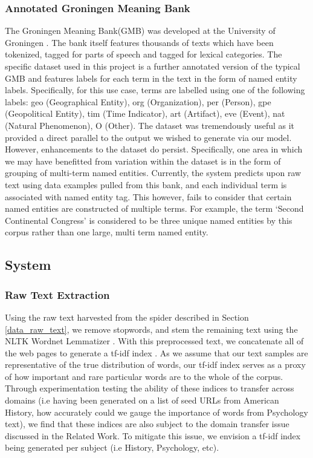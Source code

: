 \documentclass[11pt,a4paper]{article}
\begin{document}
\subsubsection{Annotated Groningen Meaning Bank}
The Groningen Meaning Bank(GMB) was developed at the University of Groningen \cite{Bos2017GMB}. The bank itself features thousands of texts which have been tokenized, tagged for parts of speech and tagged for lexical categories. The specific dataset used in this project is a further annotated version of the typical GMB and features labels for each term in the text in the form of named entity labels. Specifically, for this use case, terms are labelled using one of the following labels: geo (Geographical Entity), org (Organization), per (Person), gpe (Geopolitical Entity), tim (Time Indicator), art (Artifact), eve (Event), nat (Natural Phenomenon), O (Other). The dataset was tremendously useful as it provided a direct parallel to the output we wished to generate via our model. However, enhancements to the dataset do persist. Specifically, one area in which we may have benefitted from variation within the dataset is in the form of grouping of multi-term named entities. Currently, the system predicts upon raw text using data examples pulled from this bank, and each individual term is associated with named entity tag. This however, fails to consider that certain named entities are constructed of multiple terms. For example, the term ‘Second Continental Congress’ is considered to be three unique named entities by this corpus rather than one large, multi term named entity. 

\subsection{System}
\subsubsection{Raw Text Extraction}
Using the raw text harvested from the spider described in Section \ref{data_raw_text}, we remove stopwords, and stem the remaining text using the NLTK Wordnet Lemmatizer \cite{Fellbaum1998}. With this preprocessed text, we concatenate all of the web pages to generate a tf-idf index \cite{Ramos_usingtf-idf}. As we assume that our text samples are representative of the true distribution of words, our tf-idf index serves as a proxy of how important and rare particular words are to the whole of the corpus. Through experimentation testing the ability of these indices to transfer across domains (i.e having been generated on a list of seed URLs from American History, how accurately could we gauge the importance of words from Psychology text), we find that these indices are also subject to the domain transfer issue discussed in the Related Work. To mitigate this issue, we envision a tf-idf index being generated per subject (i.e History, Psychology, etc).
\end{document}
